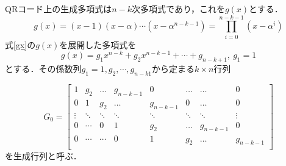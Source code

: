 \documentclass{thesis}
\begin{document}


QRコード上の生成多項式\cite{Ikeda}\cite{Tom}は$n-k$次多項式であり，これを$g(x)$とする．\\

\begin{equation}
 g(x)=(x-1)(x-\alpha)\cdots(x-\alpha^{n-k-1})= \prod_{i=0}^{n-k-1}(x-\alpha^i)
 \label{gx}
\end{equation}
式\ref{gx}の$g(x)$を展開した多項式を
\begin{equation}
 g(x)=g_1x^{n-k}+g_2x^{n-k-1}+\cdots+g_{n-k+1},\ g_1=1
 \label{gx_ten}
\end{equation}
とする．その係数列$g_1=1,g_2,\cdots,g_{n-k1}$から定まる$k\times n$行列

\[
  G_0 = \left[
    \begin{array}{cccccccc}
      1        & g_2      & \ldots  & g_{n-k-1} & 0            & \ldots  & \ldots    & 0 \\
      0        & 1        & g_2      & \ldots     & g_{n-k-1}  & 0        & \ldots    & 0 \\
      \vdots & \ddots & \ddots & \ddots     & \ddots     & \ddots & \ddots   & \vdots \\
      0        & \cdots & 0        & 1            & g_2          & \ldots & g_{n-k-1} &       0       \\
      0        & \cdots & \cdots & 0            & 1            & g_2     & \ldots     & g_{n-k-1}       \\
    \end{array}
  \right]
\]
を生成行列と呼ぶ．
\end{document}
